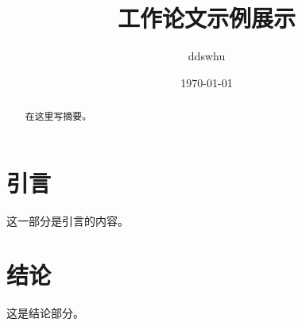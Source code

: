 \documentclass[lang=cn]{elegantpaper}
\title{工作论文示例展示}
\author{ddswhu}
\institute{Elegant\LaTeX{} 项目组}
\date{\today}
\begin{document}
\maketitle

\begin{abstract}
在这里写摘要。
\end{abstract}

\section{引言}
这一部分是引言的内容。

\section{结论}
这是结论部分。

\nocite{ref1, ref2}


\end{document}
